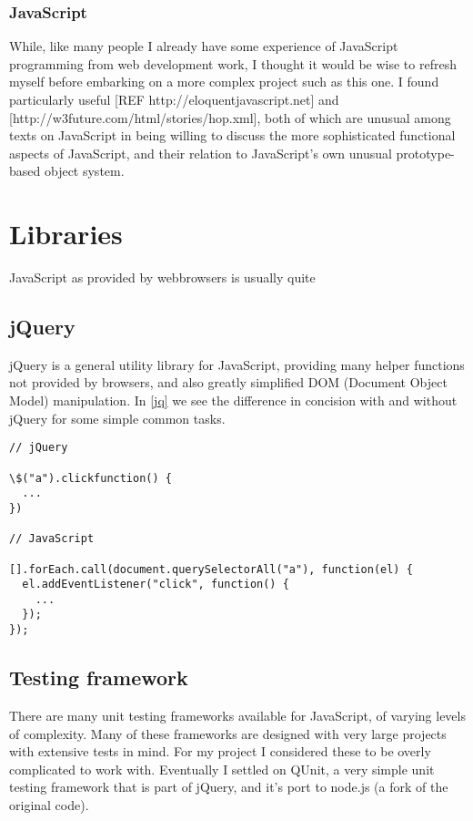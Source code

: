 \documentclass[12pt,twoside,notitlepage]{report}
\begin{document}
\subsubsection{JavaScript}
While, like many people I already have some experience of JavaScript programming from web development work, I thought it would be wise to refresh myself before embarking on a more complex project such as this one. I found particularly useful [REF http://eloquentjavascript.net] and [http://w3future.com/html/stories/hop.xml], both of which are unusual among texts on JavaScript in being willing to discuss the more sophisticated functional aspects of JavaScript, and their relation to JavaScript's own unusual prototype-based object system.


\section{Libraries}
JavaScript as provided by webbrowsers is usually quite 

\subsection{jQuery}
jQuery is a general utility library for JavaScript, providing many helper functions not provided by browsers, and also greatly simplified DOM (Document Object Model) manipulation. In \ref{jq} we see the difference in concision with and without jQuery for some simple common tasks.
\begin{verbatim}
// jQuery

\$("a").clickfunction() {
  ...
})

// JavaScript

[].forEach.call(document.querySelectorAll("a"), function(el) {
  el.addEventListener("click", function() {
    ...
  });
});
\end{verbatim}

\subsection{Testing framework}
There are many unit testing frameworks available for JavaScript, of varying levels of complexity. Many of these frameworks are designed with very large projects with extensive tests in mind. For my project I considered these to be overly complicated to work with. Eventually I settled on QUnit, a very simple unit testing framework that is part of jQuery, and it's port to node.js (a fork of the original code).
\end{document}
